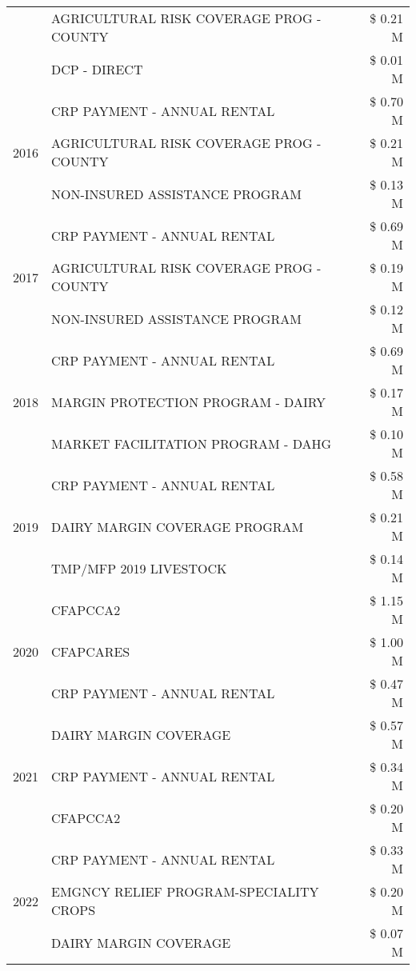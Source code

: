 \begin{tabular}{llr}
 & AGRICULTURAL RISK COVERAGE PROG - COUNTY & \$ 0.21 M \\
 & DCP - DIRECT & \$ 0.01 M \\
\cline{1-3}
\multirow[t]{3}{*}{2016} & CRP PAYMENT - ANNUAL RENTAL & \$ 0.70 M \\
 & AGRICULTURAL RISK COVERAGE PROG - COUNTY & \$ 0.21 M \\
 & NON-INSURED ASSISTANCE PROGRAM & \$ 0.13 M \\
\cline{1-3}
\multirow[t]{3}{*}{2017} & CRP PAYMENT - ANNUAL RENTAL & \$ 0.69 M \\
 & AGRICULTURAL RISK COVERAGE PROG - COUNTY & \$ 0.19 M \\
 & NON-INSURED ASSISTANCE PROGRAM & \$ 0.12 M \\
\cline{1-3}
\multirow[t]{3}{*}{2018} & CRP PAYMENT - ANNUAL RENTAL & \$ 0.69 M \\
 & MARGIN PROTECTION PROGRAM - DAIRY & \$ 0.17 M \\
 & MARKET FACILITATION PROGRAM - DAHG & \$ 0.10 M \\
\cline{1-3}
\multirow[t]{3}{*}{2019} & CRP PAYMENT - ANNUAL RENTAL & \$ 0.58 M \\
 & DAIRY MARGIN COVERAGE PROGRAM & \$ 0.21 M \\
 & TMP/MFP 2019 LIVESTOCK & \$ 0.14 M \\
\cline{1-3}
\multirow[t]{3}{*}{2020} & CFAPCCA2 & \$ 1.15 M \\
 & CFAPCARES & \$ 1.00 M \\
 & CRP PAYMENT - ANNUAL RENTAL & \$ 0.47 M \\
\cline{1-3}
\multirow[t]{3}{*}{2021} & DAIRY MARGIN COVERAGE & \$ 0.57 M \\
 & CRP PAYMENT - ANNUAL RENTAL & \$ 0.34 M \\
 & CFAPCCA2 & \$ 0.20 M \\
\cline{1-3}
\multirow[t]{3}{*}{2022} & CRP PAYMENT - ANNUAL RENTAL & \$ 0.33 M \\
 & EMGNCY RELIEF PROGRAM-SPECIALITY CROPS & \$ 0.20 M \\
 & DAIRY MARGIN COVERAGE & \$ 0.07 M \\
\cline{1-3}
\bottomrule
\end{tabular}

